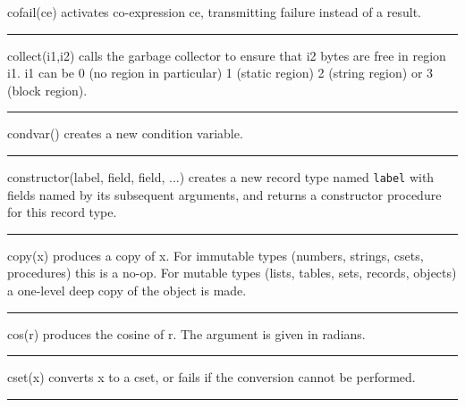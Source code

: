 \noindent
{}cofail(ce) activates
co-expression ce, transmitting failure instead of a result.

\bigskip\hrule\vspace{0.1cm}

\noindent
{}collect(i1,i2) calls the
garbage collector to ensure that i2 bytes
are free in region i1. i1 can be 0 (no region in particular)
1 (static region) 2 (string region) or 3 (block region).

\bigskip\hrule\vspace{0.1cm}

\noindent
{}condvar() creates
a new condition variable.

\bigskip\hrule\vspace{0.1cm}

\noindent
{}constructor(label, field, field, ...) creates
a new record type named \texttt{label} with fields named by its
subsequent arguments, and returns a constructor procedure for this
record type.

\bigskip\hrule\vspace{0.1cm}

\noindent
{}copy(x) produces a copy of x. For immutable types
(numbers, strings, csets, procedures) this is a no-op. For mutable
types (lists, tables, sets, records, objects) a one-level deep copy of
the object is made.

\bigskip\hrule\vspace{0.1cm}

\noindent
{}cos(r) produces the cosine of r. The argument is given in
radians.

\bigskip\hrule\vspace{0.1cm}

\noindent
{}cset(x) converts x to a cset, or fails if the
conversion cannot be performed.

\bigskip\hrule\vspace{0.1cm}

